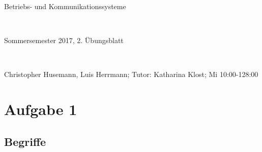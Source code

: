 \documentclass[numbers=noendperiod]{scrartcl}
\begin{document}
	
\newcommand{\inputmintedframed}[2]{
	\begin{mdframed}[linecolor=bg,backgroundcolor=bg]
		\inputminted[mathescape,breaklines,linenos,numbersep=5pt,tabsize=3]{#1}{#2}
	\end{mdframed}}
	
\hrulefill
\begin{center}
	\bfseries %
	\sffamily %
	\begin{huge}
		Betriebs- und Kommunikationssysteme
	\end{huge}\\
	\begin{Large}
		Sommersemester 2017, 2. Übungsblatt
	\end{Large}\\
	\begin{small}
		Christopher Husemann, Luis Herrmann; Tutor: Katharina Klost; Mi 10:00-128:00          	\end{small}
	
	\vspace{-10pt}
\end{center}
\hrulefill

\section*{Aufgabe 1}
\subsection*{Begriffe}
\end{document}
